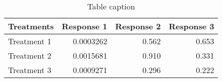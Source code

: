 

\begin{table}[h!] \centering
\small
\begin{tabular}{lrrr}
\hline
\textbf{Treatments} & \textbf{Response 1} & \textbf{Response 2} & \textbf{Response 3} \\
\hline
Treatment 1 & 0.0003262 & 0.562 & 0.653 \\
Treatment 2 & 0.0015681 & 0.910 & 0.331 \\
Treatment 3 & 0.0009271 & 0.296 & 0.222 \\
\hline
\end{tabular}
\caption{Table caption}
\end{table}
